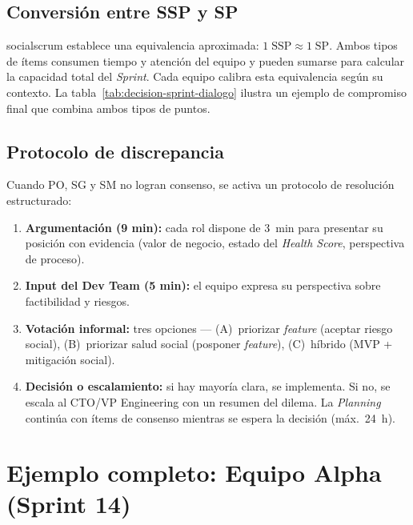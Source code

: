 \subsection{Conversión entre SSP y SP}

\gls{socialscrum} establece una equivalencia aproximada: $1\;\text{SSP} \approx 1\;\text{SP}$. Ambos tipos de ítems consumen tiempo y atención del equipo y pueden sumarse para calcular la capacidad total del \textit{Sprint}. Cada equipo calibra esta equivalencia según su contexto. La tabla~\ref{tab:decision-sprint-dialogo} ilustra un ejemplo de compromiso final que combina ambos tipos de puntos.

\subsection{Protocolo de discrepancia}

Cuando PO, SG y SM no logran consenso, se activa un protocolo de resolución estructurado:

\begin{enumerate}[nosep]
    \item \textbf{Argumentación (9 min):} cada rol dispone de 3~min para presentar su posición con evidencia (valor de negocio, estado del \textit{Health Score}, perspectiva de proceso).
    \item \textbf{Input del Dev Team (5 min):} el equipo expresa su perspectiva sobre factibilidad y riesgos.
    \item \textbf{Votación informal:} tres opciones --- (A)~priorizar \textit{feature} (aceptar riesgo social), (B)~priorizar salud social (posponer \textit{feature}), (C)~híbrido (MVP + mitigación social).
    \item \textbf{Decisión o escalamiento:} si hay mayoría clara, se implementa. Si no, se escala al CTO/VP Engineering con un resumen del dilema. La \textit{Planning} continúa con ítems de consenso mientras se espera la decisión (máx.\ 24~h).
\end{enumerate}

\section{Ejemplo completo: Equipo Alpha (Sprint 14)}

\begingroup
\scriptsize
\renewcommand{\arraystretch}{1.4}
\setlength{\tabcolsep}{4pt}
\setlength{\LTleft}{0pt}
\setlength{\LTright}{0pt}

